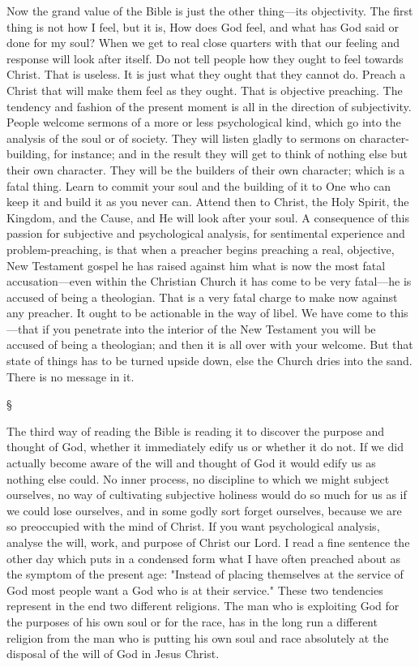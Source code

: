 \documentclass[12pt,letterpaper,oneside]{book}
\begin{document}
Now the grand value of the Bible is just the 
other thing---its objectivity. The first thing is 
not how I feel, but it is, How does God feel, 
and what has God said or done for my soul? 
When we get to real close quarters with that 
our feeling and response will look after itself. 
Do not tell people how they ought to feel 
towards Christ. That is useless. It is just 
what they ought that they cannot do. Preach 
a Christ that will make them feel as they ought. 
That is objective preaching. The tendency and 
fashion of the present moment is all in the 
direction of subjectivity. People welcome 
sermons of a more or less psychological kind, 
which go into the analysis of the soul or of 
society. They will listen gladly to sermons on 
character-building, for instance; and in the 
result they will get to think of nothing else 
but their own character. They will be the 
builders of their own character; which is a 
fatal thing. Learn to commit your soul and 
the building of it to One who can keep it 
and build it as you never can. Attend then to 
Christ, the Holy Spirit, the Kingdom, and the 
Cause, and He will look after your soul. A 
consequence of this passion for subjective and 
psychological analysis, for sentimental experience 
and problem-preaching, is that when 
a preacher begins preaching a real, objective, 
New Testament gospel he has raised against 
him what is now the most fatal accusation---even 
within the Christian Church it has come 
to be very fatal---he is accused of being a 
theologian. That is a very fatal charge to 
make now against any preacher. It ought to 
be actionable in the way of libel. We have 
come to this---that if you penetrate into the 
interior of the New Testament you will be 
accused of being a theologian; and then it is 
all over with your welcome. But that state 
of things has to be turned upside down, else 
the Church dries into the sand. There is no 
message in it. 

\begin{center}
\S
\end{center}


The third way of reading the Bible is reading 
it to discover the purpose and thought of God, 
whether it immediately edify us or whether it 
do not. If we did actually become aware of the 
will and thought of God it would edify us as 
nothing else could. No inner process, no discipline 
to which we might subject ourselves, no 
way of cultivating subjective holiness would do 
so much for us as if we could lose ourselves, and 
in some godly sort forget ourselves, because we 
are so preoccupied with the mind of Christ. If 
you want psychological analysis, analyse the 
will, work, and purpose of Christ our Lord. I 
read a fine sentence the other day which puts in 
a condensed form what I have often preached 
about as the symptom of the present age: 
"Instead of placing themselves at the service 
of God most people want a God who is at their 
service." These two tendencies represent in the 
end two different religions. The man who is 
exploiting God for the purposes of his own soul 
or for the race, has in the long run a different 
religion from the man who is putting his own 
soul and race absolutely at the disposal of the 
will of God in Jesus Christ. 
\end{document}
